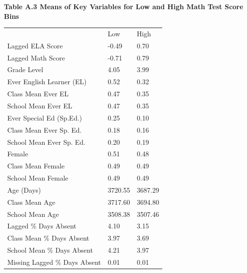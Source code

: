 \documentclass[12pt]{article}
\theoremstyle{definition}
\theoremstyle{definition}
\theoremstyle{definition}
\theoremstyle{definition}
\begin{document}
\pagebreak
\textbf{Table A.3 Means of Key Variables for Low and High Math Test Score Bins}


\begin{table}[]
\begin{tabular}{lll}
                                                        & Low     & High    \\
Lagged ELA Score                                        & -0.49   & 0.70    \\
Lagged Math Score                                       & -0.71   & 0.79    \\
Grade Level                                             & 4.05    & 3.99    \\
Ever English Learner (EL)                               & 0.52    & 0.32    \\
Class Mean Ever EL                                      & 0.47    & 0.35    \\
School Mean Ever EL                                     & 0.47    & 0.35    \\
Ever Special Ed (Sp.Ed.)                                & 0.25    & 0.10    \\
Class Mean Ever Sp. Ed.                                 & 0.18    & 0.16    \\
School Mean Ever Sp. Ed.                                & 0.20    & 0.19    \\
Female                                                  & 0.51    & 0.48    \\
Class Mean Female                                       & 0.49    & 0.49    \\
School Mean Female                                      & 0.49    & 0.49    \\
Age (Days)                                              & 3720.55 & 3687.29 \\
Class Mean Age                                          & 3717.60 & 3694.80 \\
School Mean Age                                         & 3508.38 & 3507.46 \\
Lagged \% Days Absent                                   & 4.10    & 3.15    \\
Class Mean \% Days Absent                               & 3.97    & 3.69    \\
School Mean \% Days Absent                              & 4.21    & 3.97    \\
Missing Lagged \% Days Absent                           & 0.01    & 0.01    \\

\end{tabular}
\end{table}
\end{document}
